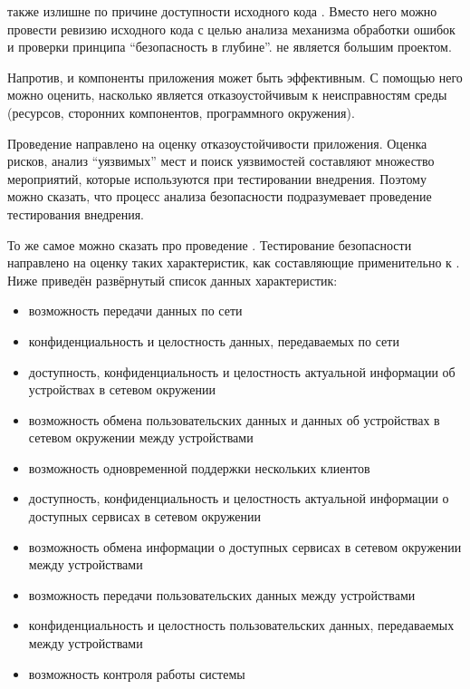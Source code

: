 %
 также излишне по причине доступности исходного кода . 
%
Вместо него можно провести ревизию исходного кода с целью анализа механизма обработки ошибок и проверки принципа ``безопасность в глубине''. 
%
 не является большим проектом. 

%
Напротив,  и компоненты приложения может быть эффективным. 
%
С помощью него можно оценить, насколько  является отказоустойчивым к неисправностям среды (ресурсов, сторонних компонентов, программного окружения). 

%
Проведение  направлено на оценку отказоустойчивости приложения. 
%
Оценка рисков, анализ ``уязвимых'' мест и поиск уязвимостей составляют множество мероприятий, которые используются при тестировании внедрения. 
%
Поэтому можно сказать, что процесс анализа безопасности  подразумевает проведение тестирования внедрения. 

%
То же самое можно сказать про проведение . 
%
Тестирование безопасности  направлено на оценку таких характеристик, как составляющие  применительно к . Ниже приведён развёрнутый список данных характеристик:
\begin{itemize}
	\setlength{\itemsep}{0pt}%

	\item возможность передачи данных по сети
	\item конфиденциальность и целостность данных, передаваемых по сети

	\item доступность, конфиденциальность и целостность актуальной информации об устройствах в сетевом окружении
	\item возможность обмена пользовательских данных и данных об устройствах в сетевом окружении между устройствами
	\item возможность одновременной поддержки нескольких клиентов

	\item доступность, конфиденциальность и целостность актуальной информации о доступных сервисах в сетевом окружении
	\item возможность обмена информации о доступных сервисах в сетевом окружении между устройствами

	\item возможность передачи пользовательских данных между устройствами
	\item конфиденциальность и целостность пользовательских данных, передаваемых между устройствами
	\item возможность контроля работы системы
\end{itemize}

